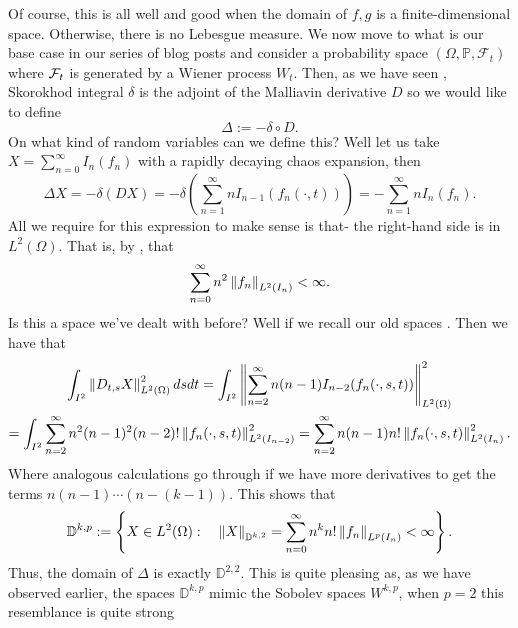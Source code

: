 \documentclass[
    a4paper,
    DIV=14,
    abstract=true,
    numbers=noenddot
]{scrartcl}
\begin{document}
	Of course, this is all well and good when the domain of $f,g$ is a finite-dimensional space. Otherwise, there is no Lebesgue measure.	We now move to what is our base case in our series of blog posts and consider a probability space $(\Omega,\mathbb{P},\mathcal{F}_t)$ where $\mathcal{F}_t$ is generated by a Wiener process $W_t$. Then, as we have seen , Skorokhod integral $\delta $ is the adjoint of the Malliavin derivative $D$ so we would like to define
	\begin{equation*}
		\Delta  := -\delta \circ D.
	\end{equation*}
	On what kind of random variables can we define this? Well let us take $X=\sum_{n=0}^{\infty}  I_n(f_n)$ with a rapidly decaying chaos expansion, then
	\begin{equation*}
		\Delta X=-\delta (DX)=-\delta \left(\sum_{n=1}^\infty nI_{n-1}(f_n(\cdot ,t))\right)=-\sum_{n=1}^\infty nI_{n}(f_n).
	\end{equation*}
	All we require for this expression to make sense is that- the right-hand side is in $L^2(\Omega)$. That is, by  , that
	\begin{equation*}
		\sum_{n=0}^\infty n^2 \left\lVert f_n \right\rVert_{L^2(I_n)}< \infty.
	\end{equation*}
	Is this a space we've dealt with before? Well if we recall our old spaces . Then we have that
	\begin{multline*}
		\int_{I^2}\left\lVert D_{t,s}X \right\rVert_{L^2(\Omega)}^2 ds d t=\int_{I^2}\left\lVert \sum_{n=2}^\infty n(n-1)I_{n-2}(f_n(\cdot ,s,t)) \right\rVert_{L^2(\Omega)}^2\\=\int_{I^2}\sum_{n=2}^\infty n^2(n-1)^2(n-2)!\left\lVert f_n(\cdot ,s,t) \right\rVert_{L^2(I_{n-2})}^2=\sum_{n=2}^\infty n(n-1)n!\left\lVert f_n(\cdot ,s,t) \right\rVert_{L^2(I_n)}^2.
	\end{multline*}
	Where analogous calculations go through if we have more derivatives to get the terms $n(n-1)\cdots (n-(k-1))$. This shows that
	\begin{equation*}
		\mathbb{D}^{k,p}:=\left\{X\in L^2(\Omega):\quad \left\lVert X \right\rVert_{\mathbb{D}^{k,2}}=\sum_{n=0}^\infty n^kn! \left\lVert f_n \right\rVert_{L^p(I_n)}< \infty\right\} .
	\end{equation*}
	Thus, the domain of $\Delta $ is exactly  $\mathbb{D}^{2,2}$. This is quite pleasing as, as we have observed earlier, the spaces $\mathbb{D}^{k,p}$ mimic the Sobolev spaces $W^{k,p}$, when $p=2$ this resemblance is quite strong
\end{document}
